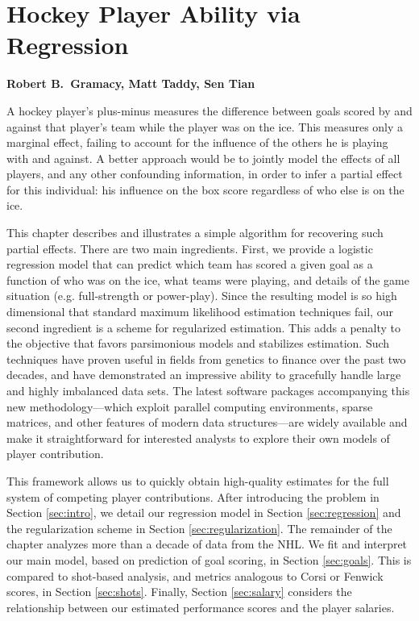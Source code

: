 
\chapter{Hockey Player Ability via Regression}

\noindent
{\bf Robert B.~Gramacy, Matt Taddy, Sen Tian}

\bigskip
A hockey player's plus-minus measures the difference between goals scored by
and against that player's team while the player was on the ice.  This measures
only a marginal effect, failing to account for the
influence of the others he is playing with and against.   A better approach
would be to jointly model the effects of all players, and any other
confounding information, in order to infer a partial effect
for this individual: his influence on the box score regardless of who else is
on the ice.

This chapter describes and illustrates a  simple algorithm for recovering such partial effects.  There are
two main ingredients.  First, we provide a logistic regression model that can
predict which team has scored a given goal as a function of who was on the
ice, what teams were playing, and details of the game situation (e.g.
full-strength or power-play).  Since the resulting model is so high
dimensional that standard maximum likelihood estimation techniques fail,  our
second ingredient is a scheme for regularized estimation.  This adds a
penalty to the objective that favors parsimonious models and stabilizes estimation.  Such techniques 
have proven useful in fields from genetics to finance over the past two decades, and have demonstrated an impressive ability to gracefully handle
large and highly imbalanced data sets.  The latest software packages accompanying this new
methodology---which exploit
parallel computing environments, sparse matrices, and other features of modern
data structures---are widely available and make it straightforward for interested analysts to explore their own models of player contribution.

This framework allows us to quickly obtain high-quality estimates for the full system of
competing player contributions. After introducing the problem in Section \ref{sec:intro}, we detail our regression model in Section \ref{sec:regression} and the regularization scheme in Section \ref{sec:regularization}.  The remainder of the chapter analyzes more than a decade of data from the NHL.  We fit and interpret our main model, based on prediction of goal scoring, in Section \ref{sec:goals}.  This is compared to shot-based analysis, and metrics analogous to Corsi or Fenwick scores, in Section \ref{sec:shots}.  Finally, Section \ref{sec:salary} considers the relationship between our estimated  performance scores and the player salaries.


